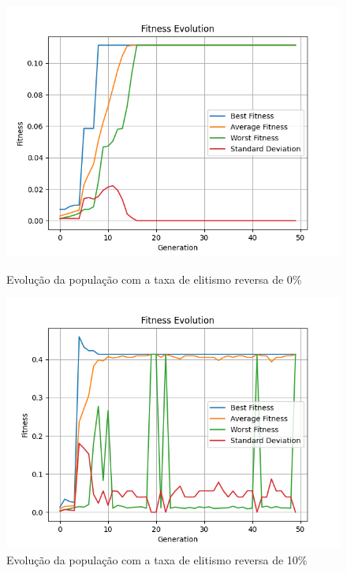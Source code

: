 \documentclass[12pt]{article}
\begin{document}
\begin{figure}[h]
    \centering
    \begin{minipage}{0.45\textwidth}
        \centering
        \includegraphics[width=\linewidth]{figures/sexuado/rev_ev_0.png}
        \caption{Evolução da população com a taxa de elitismo reversa de 0\%}
        \label{fig:reverse_elitism_sex_0}
    \end{minipage}\hfill
    \begin{minipage}{0.45\textwidth}
        \centering
        \includegraphics[width=\linewidth]{figures/sexuado/rev_el_10.png}
        \caption{Evolução da população com a taxa de elitismo reversa de 10\%}
        \label{fig:reverse_elitism_sex_10}
    \end{minipage}
\end{figure}
\end{document}
